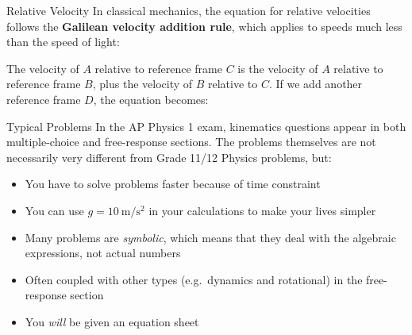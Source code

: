 \documentclass[12pt,compress,aspectratio=169]{beamer}
\begin{document}
\begin{frame}{Relative Velocity}
  In classical mechanics, the equation for relative velocities follows the
  \textbf{Galilean velocity addition rule}, which applies to speeds much less
  than the speed of light:


  The velocity of $A$ relative to reference frame $C$ is the velocity of $A$
  relative to reference frame $B$, plus the velocity of $B$ relative to $C$. If
  we add another reference frame $D$, the equation becomes:

\end{frame}


\begin{frame}{Typical Problems}
  In the AP Physics 1 exam, kinematics questions appear in
  both multiple-choice and free-response sections. The problems themselves
  are not necessarily very different from Grade 11/12 Physics problems, but:
  \begin{itemize}
  \item You have to solve problems faster because of time constraint
  \item You can use $g=\SI{10}{\metre/\second\squared}$ in your calculations to
    make your lives simpler
  \item Many problems are \emph{symbolic}, which means that they deal with
    the algebraic expressions, not actual numbers
  \item Often coupled with other types (e.g.\ dynamics and rotational) in
    the free-response section
  \item You \emph{will} be given an equation sheet
  \end{itemize}
\end{frame}
\end{document}
